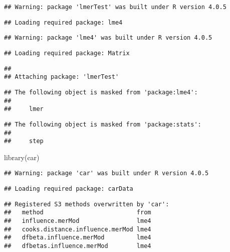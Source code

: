 \documentclass[
]{article}
\newenvironment{Shaded}{\begin{snugshade}}{\end{snugshade}}
\newcommand{\FunctionTok}[1]{\textcolor[rgb]{0.00,0.00,0.00}{#1}}
\newcommand{\NormalTok}[1]{#1}
\begin{document}
\begin{verbatim}
## Warning: package 'lmerTest' was built under R version 4.0.5
\end{verbatim}

\begin{verbatim}
## Loading required package: lme4
\end{verbatim}

\begin{verbatim}
## Warning: package 'lme4' was built under R version 4.0.5
\end{verbatim}

\begin{verbatim}
## Loading required package: Matrix
\end{verbatim}

\begin{verbatim}
## 
## Attaching package: 'lmerTest'
\end{verbatim}

\begin{verbatim}
## The following object is masked from 'package:lme4':
## 
##     lmer
\end{verbatim}

\begin{verbatim}
## The following object is masked from 'package:stats':
## 
##     step
\end{verbatim}

\begin{Shaded}
\begin{Highlighting}[]
\FunctionTok{library}\NormalTok{(car)}
\end{Highlighting}
\end{Shaded}

\begin{verbatim}
## Warning: package 'car' was built under R version 4.0.5
\end{verbatim}

\begin{verbatim}
## Loading required package: carData
\end{verbatim}

\begin{verbatim}
## Registered S3 methods overwritten by 'car':
##   method                          from
##   influence.merMod                lme4
##   cooks.distance.influence.merMod lme4
##   dfbeta.influence.merMod         lme4
##   dfbetas.influence.merMod        lme4
\end{verbatim}
\end{document}

